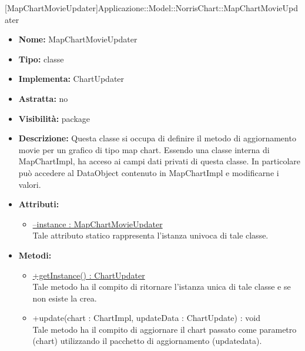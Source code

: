 			
			[MapChartMovieUpdater]{Applicazione::Model::NorrisChart::MapChartMovieUpdater}
			

	
			
			\begin{itemize}
			\item \textbf{Nome:} MapChartMovieUpdater
			\item \textbf{Tipo:} classe
			
		\item \textbf{Implementa:}
		ChartUpdater
		\item \textbf{Astratta:}
		no
			\item \textbf{Visibilità:} package
			\item \textbf{Descrizione:} Questa classe si occupa di definire il metodo di aggiornamento movie per un grafico di tipo map chart. Essendo una classe interna di MapChartImpl, ha acceso ai campi dati privati di questa classe. In particolare può accedere al DataObject contenuto in MapChartImpl e modificarne i valori.
			\item \textbf{Attributi:}
				\begin{itemize}
				\setlength{\itemsep}{5pt}
				
					\item[\ding{111}] \underline{--instance : MapChartMovieUpdater} \\ [1mm] Tale attributo statico rappresenta l'istanza univoca di tale classe.
				\end{itemize}
		
			\item \textbf{Metodi:}
				\begin{itemize}
				\setlength{\itemsep}{5pt}
				
					\item[\ding{111}] {\underline{+getInstance() : ChartUpdater}} \\ [1mm] Tale metodo ha il compito di ritornare l'istanza unica di tale classe e se non esiste la crea.
					\item[\ding{111}] {{+update(chart : ChartImpl, updateData : ChartUpdate) : void}} \\ [1mm] Tale metodo ha il compito di aggiornare il chart passato come parametro (chart) utilizzando il pacchetto di aggiornamento (updatedata).
				\end{itemize}
		
			\end{itemize}

